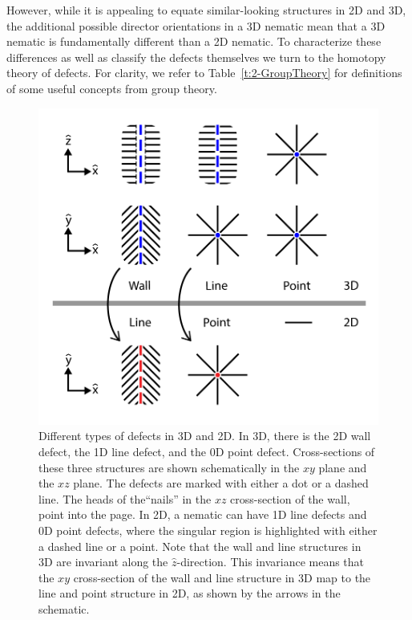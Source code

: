 However, while it is appealing to equate similar-looking structures in 2D and 3D, the additional possible director orientations in a 3D nematic mean that a 3D nematic is fundamentally different than a 2D nematic.
To characterize these differences as well as classify the defects themselves we turn to the homotopy theory of defects.
For clarity, we refer to Table~\ref{t:2-GroupTheory} for definitions of some useful concepts from group theory.\\
\begin{figure}[h]
  \centering
  \includegraphics{figures/C2/Ch2-Figs_GenDef.png}
  \caption{Different types of defects in 3D and 2D.
  In 3D, there is the 2D wall defect, the 1D line defect, and the 0D point defect.
  Cross-sections of these three structures are shown schematically in the $xy$ plane and the $xz$ plane.
  The defects are marked with either a dot or a dashed line.
  The heads of the``nails'' in the $xz$ cross-section of the wall, point into the page.
  In 2D, a nematic can have 1D line defects and 0D point defects, where the singular region is highlighted with either a dashed line or a point.
  Note that the wall and line structures in 3D are invariant along the $\hat{z}$-direction.
  This invariance means that the $xy$ cross-section of the wall and line structure in 3D map to the line and point structure in 2D, as shown by the arrows in the schematic.}\label{f:2-GenDef}
\end{figure}

